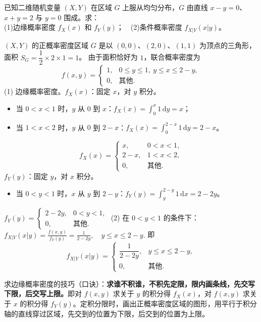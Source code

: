 \documentclass[lang=cn,11pt]{elegantbook}
\begin{document}
\begin{exercise}[三角形区域上的均匀分布] \label{exer:3-13}
已知二维随机变量 $(X,Y)$ 在区域 $G$ 上服从均匀分布，$G$ 由直线 $x-y=0$、$x+y=2$ 与 $y=0$ 围成。求：\\
(1)边缘概率密度 $f_X(x)$ 和 $f_Y(y)$；~~(2)条件概率密度 $f_{X|Y}(x|y)$。
\end{exercise}
\begin{solution}
$(X,Y)$ 的正概率密度区域 $G$ 是以 $(0,0)$、$(2,0)$、$(1,1)$ 为顶点的三角形，面积 $S_G = \dfrac{1}{2} \times 2 \times 1 = 1$。
由于面积恰好为 $1$，联合概率密度为
\[
f(x,y) = \begin{cases} 1, & 0 \leqslant y \leqslant 1,\ y \leqslant x \leqslant 2-y, \\ 0, & \text{其他}. \end{cases}
\]
(1) 边缘概率密度。$f_X(x)$：固定 $x$，对 $y$ 积分。
\begin{itemize}
    \item 当 $0 < x < 1$ 时，$y$ 从 $0$ 到 $x$：$f_X(x) = \displaystyle\int_0^x 1\,\mathrm{d}y = x$；
    \item 当 $1 < x < 2$ 时，$y$ 从 $0$ 到 $2-x$：$f_X(x) = \displaystyle\int_0^{2-x} 1\,\mathrm{d}y = 2-x$。
\end{itemize}
\[
f_X(x) = \begin{cases} x, & 0 < x < 1, \\ 2-x, & 1 < x < 2, \\ 0, & \text{其他}. \end{cases}
\]
$f_Y(y)$：固定 $y$，对 $x$ 积分。
\begin{itemize}
    \item 当 $0 < y < 1$ 时，$x$ 从 $y$ 到 $2-y$：$f_Y(y) = \displaystyle\int_y^{2-y} 1\,\mathrm{d}x = 2-2y$。
\end{itemize}
\(
f_Y(y) = \begin{cases} 2-2y, & 0 < y < 1, \\ 0, & \text{其他}. \end{cases}
\)
(2) 在 $0 < y < 1$ 的条件下：
\(
f_{X|Y}(x|y) = \frac{f(x,y)}{f_Y(y)} = \frac{1}{2-2y}, \quad y \leqslant x \leqslant 2-y.
\)
即
\[
f_{X|Y}(x|y) = \begin{cases} \dfrac{1}{2-2y}, & y \leqslant x \leqslant 2-y, \\ 0, & \text{其他}. \end{cases}
\]
\end{solution}
\begin{note}
求边缘概率密度的技巧（口诀）：\textbf{求谁不积谁，不积先定限，限内画条线，先交写下限，后交写上限。}即对 $f(x,y)$ 求关于 $y$ 的积分得 $f_X(x)$，对 $f(x,y)$ 求关于 $x$ 的积分得 $f_Y(y)$。定积分限时，画出正概率密度区域的图形，用平行于积分轴的直线穿过区域，先交到的位置为下限，后交到的位置为上限。
\end{note}
\end{document}
